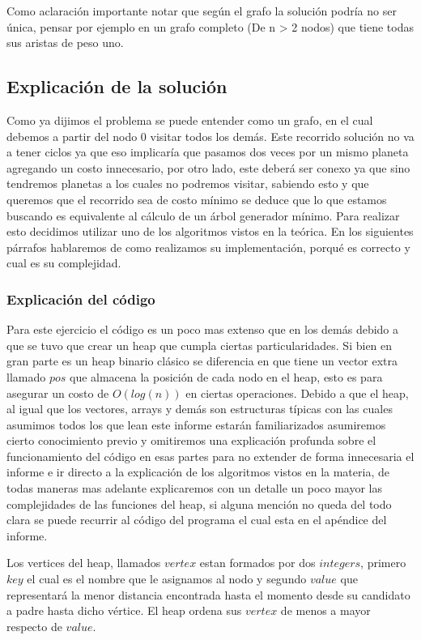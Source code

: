 Como aclaración importante notar que según el grafo la solución podría no ser única, pensar por ejemplo en un grafo completo (De n > 2 nodos) que tiene todas sus aristas de peso uno.

\subsection{Explicación de la solución}

Como ya dijimos el problema se puede entender como un grafo, en el cual debemos a partir del nodo 0 visitar todos los demás. Este recorrido solución no va a tener ciclos ya que eso implicaría que pasamos dos veces por un mismo planeta agregando un costo innecesario, por otro lado, este deberá ser conexo ya que sino tendremos planetas a los cuales no podremos visitar, sabiendo esto y que queremos que el recorrido sea de costo mínimo se deduce que lo que estamos buscando es equivalente al cálculo de un árbol generador mínimo. Para realizar esto decidimos utilizar uno de los algoritmos vistos en la teórica. En los siguientes párrafos hablaremos de como realizamos su implementación, porqué es correcto y cual es su complejidad.

\subsubsection{Explicación del código}

Para este ejercicio el código es un poco mas extenso que en los demás debido a que se tuvo que crear un heap que cumpla ciertas particularidades. Si bien en gran parte es un heap binario clásico se diferencia en que tiene un vector extra llamado $pos$ que almacena la posición de cada nodo en el heap, esto es para asegurar un costo de $O(log(n))$ en ciertas operaciones. Debido a que el heap, al igual que los vectores, arrays y demás son estructuras típicas con las cuales asumimos todos los que lean este informe estarán familiarizados asumiremos cierto conocimiento previo y omitiremos una explicación profunda sobre el funcionamiento del código en esas partes para no extender de forma innecesaria el informe e ir directo a la explicación de los algoritmos vistos en la materia, de todas maneras mas adelante explicaremos con un detalle un poco mayor las complejidades de las funciones del heap, si alguna mención no queda del todo clara se puede recurrir al código del programa el cual esta en el apéndice del informe.

Los vertices del heap, llamados $vertex$ estan formados por dos $integers$, primero $key$ el cual es el nombre que le asignamos al nodo y segundo $value$ que representará la menor distancia encontrada hasta el momento desde su candidato a padre hasta dicho vértice. El heap ordena sus $vertex$ de menos a mayor respecto de $value$.

